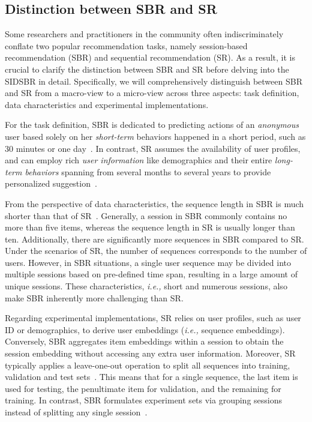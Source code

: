 \documentclass[lettersize,journal]{IEEEtran}
\newcommand{\ie}{\emph{i.e.,}\xspace}
\newcommand{\baby}{{SIDSBR}\xspace}
\begin{document}
\subsection{Distinction between SBR and SR}\label{disSBRSR}
Some researchers and practitioners in the community often indiscriminately conflate two popular recommendation tasks, namely session-based recommendation (SBR) and sequential recommendation (SR). As a result, it is crucial to clarify the distinction between SBR and SR before delving into the \baby in detail. Specifically, we will comprehensively distinguish between SBR and SR from a macro-view to a micro-view across three aspects: task definition, data characteristics and experimental implementations. 

For the task definition, SBR is dedicated to predicting actions of an \textit{anonymous} user based solely on her \textit{short-term} behaviors happened in a short period, such as 30 minutes or one day~\cite{Yuan@WWW2020,Wei@WWW2022,Xin@WSDM2024}. In contrast, SR assumes the availability of user profiles, and can employ rich \textit{user information} like demographics and their entire \textit{long-term behaviors} spanning from several months to several years to provide personalized suggestion~\cite{Li@SIGIR2024,FineRec,Li@TKDE2024}. 

From the perspective of data characteristics, the sequence length in SBR is much shorter than that of SR~\cite{Zhang@AAAI2024,Choi@SIGIR2024,Wang@SDM2021}. Generally, a session in SBR commonly contains no more than five items, whereas the sequence length in SR is usually longer than ten. Additionally, there are significantly more sequences in SBR compared to SR. Under the scenarios of SR, the number of sequences corresponds to the number of users. However, in SBR situations, a single user sequence may be divided into multiple sessions based on pre-defined time span, resulting in a large amount of unique sessions. These characteristics, \ie short and numerous sessions, also make SBR inherently more challenging than SR. 

Regarding experimental implementations, SR relies on user profiles, such as user ID or demographics, to derive user embeddings (\ie sequence embeddings). Conversely, SBR aggregates item embeddings within a session to obtain the session embedding without accessing any extra user information. Moreover, SR typically applies a leave-one-out operation to split all sequences into training, validation and test sets~\cite{Xie@ICDE2022,Li@TOIS2024,Lin@WWW2023}. This means that for a single sequence, the last item is used for testing, the penultimate item for validation, and the remaining for training. In contrast, SBR formulates experiment sets via grouping sessions instead of splitting any single session~\cite{MTD,Chen@CIKM2019,GC-SAN}. 
\end{document}
